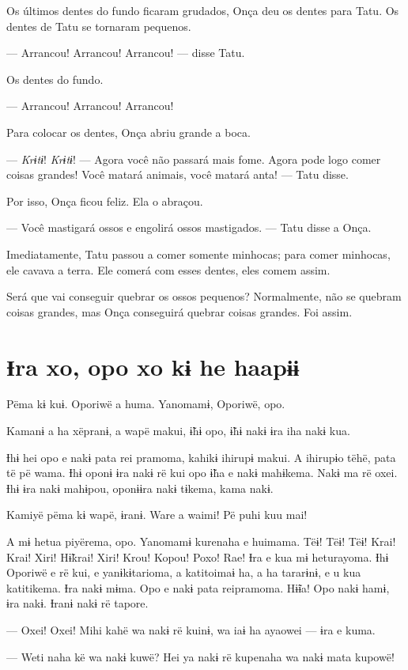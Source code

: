 Os últimos dentes do fundo ficaram grudados, Onça deu os dentes para
Tatu. Os dentes de Tatu se tornaram pequenos.

--- Arrancou! Arrancou! Arrancou! --- disse Tatu.

Os dentes do fundo. 

--- Arrancou! Arrancou! Arrancou! 

Para colocar os dentes, Onça abriu grande a boca. 

--- \textit{Krɨtɨ}! \textit{Krɨtɨ}! --- Agora você não passará mais fome. Agora pode logo
comer coisas grandes! Você matará animais, você matará anta! --- Tatu
disse. 

Por isso, Onça ficou feliz. Ela o abraçou. 

--- Você mastigará ossos e engolirá ossos mastigados. --- Tatu disse a
Onça. 

Imediatamente, Tatu  passou a comer somente minhocas; para comer minhocas, ele
cavava a terra. Ele comerá com esses dentes, eles comem assim. 

Será que vai conseguir quebrar os ossos pequenos? Normalmente, não se
quebram coisas grandes, mas Onça conseguirá quebrar coisas grandes.
Foi assim. 
 
\chapter{Ɨra xo, opo xo kɨ he haapɨɨ}

 Pëma kɨ kuɨ. Oporiwë a huma. Yanomamɨ, Oporiwë, opo. 

Kamanɨ a ha xëpranɨ, a wapë makui, ɨ̃hɨ opo, ɨ̃hɨ nakɨ ɨra iha nakɨ kua. 

Ɨhɨ hei opo e nakɨ pata rei pramoma, kahikɨ ihirupɨ makui. A ihirupɨo
tëhë, pata të pë wama. Ɨhɨ oponɨ ɨra nakɨ rë kui opo ɨ̃ha e nakɨ
mahɨkema. Nakɨ ma rë oxei. Ɨhɨ ɨra nakɨ mahɨpou, oponɨɨra nakɨ tɨkema,
kama nakɨ. 

Kamiyë pëma kɨ wapë, ɨranɨ. Ware a waimi! Pë puhi kuu mai! 

A mɨ hetua piyërema, opo. Yanomamɨ kurenaha e huimama. Tëɨ! Tëɨ! Tëɨ!
Krai! Krai! Xiri! Hɨ̃krai! Xiri! Krou! Kopou! Poxo! Rae! Ɨra e kua mɨ
heturayoma. Ɨhɨ Oporiwë e rë kui, e yanɨkɨtarioma, a katitoimaɨ ha, a ha
tararɨnɨ, e u kua katitikema. Ɨra nakɨ mɨma. Opo e nakɨ pata reipramoma.
Hɨ̃ɨa! Opo nakɨ hamɨ, ɨra nakɨ. Ɨranɨ nakɨ rë tapore. 

--- Oxei! Oxei! Mihi kahë wa nakɨ rë kuinɨ, wa iaɨ ha ayaowei --- ɨra e
kuma. 

--- Weti naha kë wa nakɨ kuwë? Hei ya nakɨ rë kupenaha wa nakɨ mata
kupowë! 

